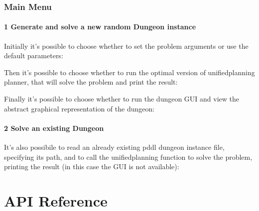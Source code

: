 \documentclass[letterpaper,10pt,english]{sphinxmanual}
\begin{document}
\subsection{Main Menu}
\label{\detokenize{getting_started/quickstart:main-menu}}
\sphinxAtStartPar
{}


\subsubsection{1 \sphinxhyphen{} Generate and solve a new random Dungeon instance}
\label{\detokenize{getting_started/quickstart:generate-and-solve-a-new-random-dungeon-instance}}
\sphinxAtStartPar
Initially it’s possible to choose whether to set the problem arguments or use the default parameters:

\sphinxAtStartPar
{}

\sphinxAtStartPar
Then it’s possible to choose whether to run the optimal version of unified\sphinxhyphen{}planning planner, that will solve the problem and print the result:

\sphinxAtStartPar
{}

\sphinxAtStartPar
Finally it’s possible to choose whether to run the dungeon GUI and view the abstract graphical representation of the dungeon:

\sphinxAtStartPar
{}

\sphinxAtStartPar
{}

\sphinxAtStartPar
{}


\subsubsection{2 \sphinxhyphen{} Solve an existing Dungeon}
\label{\detokenize{getting_started/quickstart:solve-an-existing-dungeon}}
\sphinxAtStartPar
It’s also possibile to read an already existing pddl dungeon instance file, specifying its path, and to call the unified\sphinxhyphen{}planning function to solve the problem, printing the result (in this case the GUI is not available):

\sphinxAtStartPar
{}

\sphinxstepscope


\chapter{API Reference}
\label{\detokenize{api_reference:api-reference}}\label{\detokenize{api_reference::doc}}
\sphinxstepscope
\end{document}
